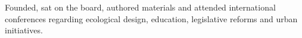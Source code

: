 \documentclass[line,margin,hidelinks]{res}
\begin{document}
\begin{resume}

\begin{position}
  Founded, sat on the board, authored materials and attended international
  conferences regarding ecological design, education, legislative reforms and
  urban initiatives.
\end{position}


%



\end{resume}
\end{document}
